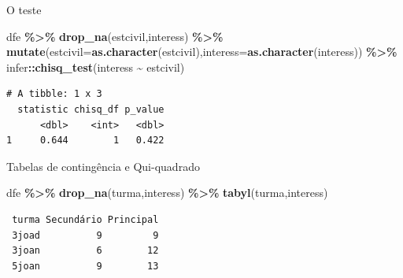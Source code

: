 \documentclass[
  9pt,
  ignorenonframetext,
  aspectratio=169]{beamer}
\newenvironment{Shaded}{\begin{snugshade}}{\end{snugshade}}
\newcommand{\DataTypeTok}[1]{\textcolor[rgb]{0.13,0.29,0.53}{#1}}
\newcommand{\KeywordTok}[1]{\textcolor[rgb]{0.13,0.29,0.53}{\textbf{#1}}}
\newcommand{\NormalTok}[1]{#1}
\newcommand{\OperatorTok}[1]{\textcolor[rgb]{0.81,0.36,0.00}{\textbf{#1}}}
\newcommand{\StringTok}[1]{\textcolor[rgb]{0.31,0.60,0.02}{#1}}
\begin{document}
\begin{frame}[fragile]{O teste}
\protect\hypertarget{o-teste}{}
\begin{Shaded}
\begin{Highlighting}[]
\NormalTok{dfe }\OperatorTok{\%\textgreater{}\%}\StringTok{ }\KeywordTok{drop\_na}\NormalTok{(estcivil,interess) }\OperatorTok{\%\textgreater{}\%}
\StringTok{  }\KeywordTok{mutate}\NormalTok{(}\DataTypeTok{estcivil=}\KeywordTok{as.character}\NormalTok{(estcivil),}\DataTypeTok{interess=}\KeywordTok{as.character}\NormalTok{(interess)) }\OperatorTok{\%\textgreater{}\%}\StringTok{ }
\StringTok{  }\NormalTok{infer}\OperatorTok{::}\KeywordTok{chisq\_test}\NormalTok{(interess }\OperatorTok{\textasciitilde{}}\StringTok{ }\NormalTok{estcivil)}
\end{Highlighting}
\end{Shaded}

\begin{verbatim}
# A tibble: 1 x 3
  statistic chisq_df p_value
      <dbl>    <int>   <dbl>
1     0.644        1   0.422
\end{verbatim}
\end{frame}

\begin{frame}[fragile]{Tabelas de contingência e Qui-quadrado}
\protect\hypertarget{tabelas-de-continguxeancia-e-qui-quadrado-1}{}
\begin{Shaded}
\begin{Highlighting}[]
\NormalTok{dfe }\OperatorTok{\%\textgreater{}\%}\StringTok{ }\KeywordTok{drop\_na}\NormalTok{(turma,interess) }\OperatorTok{\%\textgreater{}\%}
\StringTok{  }\KeywordTok{tabyl}\NormalTok{(turma,interess)}
\end{Highlighting}
\end{Shaded}

\begin{verbatim}
 turma Secundário Principal
 3joad          9         9
 3joan          6        12
 5joan          9        13
\end{verbatim}
\end{frame}
\end{document}
